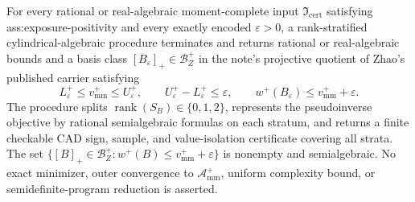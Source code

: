 For every rational or real-algebraic moment-complete input \(\mathfrak I_{\mathrm{cert}}\) satisfying ass:exposure-positivity and every exactly encoded \(\varepsilon>0\), a rank-stratified cylindrical-algebraic procedure terminates and returns rational or real-algebraic bounds and a basis class \([B_\varepsilon]_+\in\mathcal B_Z^+\) in the note's projective quotient of Zhao's published carrier satisfying
\[
L_\varepsilon^+\le v_{\mathrm{mm}}^+\le U_\varepsilon^+,
\qquad U_\varepsilon^+-L_\varepsilon^+\le\varepsilon,
\qquad w^+(B_\varepsilon)\le v_{\mathrm{mm}}^++\varepsilon.
\]
The procedure splits \(\operatorname{rank}(S_B)\in\{0,1,2\}\), represents the pseudoinverse objective by rational semialgebraic formulas on each stratum, and returns a finite checkable CAD sign, sample, and value-isolation certificate covering all strata.  The set \(\{[B]_+\in\mathcal B_Z^+:w^+(B)\le v_{\mathrm{mm}}^++\varepsilon\}\) is nonempty and semialgebraic.  No exact minimizer, outer convergence to \(\mathcal A_{\mathrm{mm}}^+\), uniform complexity bound, or semidefinite-program reduction is asserted.